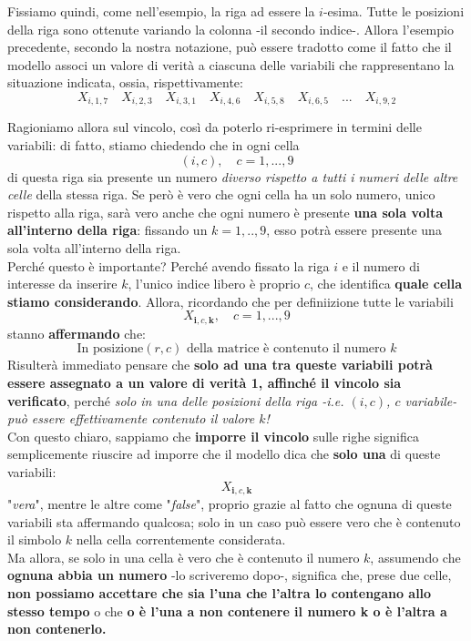 \documentclass[a4paper,10pt]{article}
\begin{document}
{\begin{itemize}[label=, leftmargin=0pt]
\begin{osservazioni}
    Fissiamo quindi, come nell'esempio, la riga ad essere la $i$-esima. Tutte le posizioni della riga sono ottenute variando la colonna -il secondo indice-. Allora l'esempio precedente, secondo la nostra notazione, può essere tradotto come il fatto che il modello associ un valore di verità a ciascuna delle variabili che rappresentano la situazione indicata, ossia, rispettivamente:
    $$X_{i,1,7}\quad X_{i,2,3}\quad X_{i,3,1}\quad X_{i,4,6}\quad X_{i,5,8}\quad X_{i,6,5} \quad ... \quad X_{i,9,2}$$

    Ragioniamo allora sul vincolo, così da poterlo ri-esprimere in termini delle variabili:
    di fatto, stiamo chiedendo che in ogni cella $$(i,c),\quad c=1,...,9$$ di questa riga sia presente un numero \textit{diverso rispetto a tutti i numeri delle altre celle} della stessa riga. Se però è vero che ogni cella ha un solo numero, unico rispetto alla riga, sarà vero anche che ogni numero è presente \textbf{una sola volta all'interno della riga}: fissando un $k=1,..,9$, esso potrà essere presente una sola volta all'interno della riga.\\

    Perché questo è importante? Perché avendo fissato la riga $i$ e il numero di interesse da inserire $k$, l'unico indice libero è proprio $c$, che identifica \textbf{quale cella stiamo considerando}. Allora, ricordando che per definiizione tutte le variabili 
    $$X_{\mathbf{i},c,\mathbf{k}},\quad c=1,...,9$$
    stanno \textbf{affermando} che:
    $$\text{In\ posizione} (r,c) \text{\ della\ matrice\ è\ contenuto\ il\ numero \ }k$$
    Risulterà immediato pensare che \textbf{solo ad una tra queste variabili potrà essere assegnato a un valore di verità 1, affinché il vincolo sia verificato}, perché \textit{solo in una delle posizioni della riga -i.e. $(i,c)$, $c$ variabile- può essere effettivamente contenuto il valore $k$!}\\

    Con questo chiaro, sappiamo che \textbf{imporre il vincolo} sulle righe significa semplicemente riuscire ad imporre che il modello dica che \textbf{solo una} di queste variabili:
    $$X_{\mathbf{i},c,\mathbf{k}}$$
    "\textit{vera}", mentre le altre come "\textit{false}", proprio grazie al fatto che ognuna di queste variabili sta affermando qualcosa; solo in un caso può essere vero che è contenuto il simbolo $k$ nella cella correntemente considerata. \\

    Ma allora, se solo in una cella è vero che è contenuto il numero $k$, assumendo che \textbf{ognuna abbia un numero} -lo scriveremo dopo-, significa che, prese due celle,  \textbf{non possiamo accettare che sia l'una che l'altra lo contengano allo stesso tempo} o che \textbf{o è l'una a non contenere il numero k o è l'altra a non contenerlo.} 


\end{osservazioni}
\end{itemize}}
\end{document}
